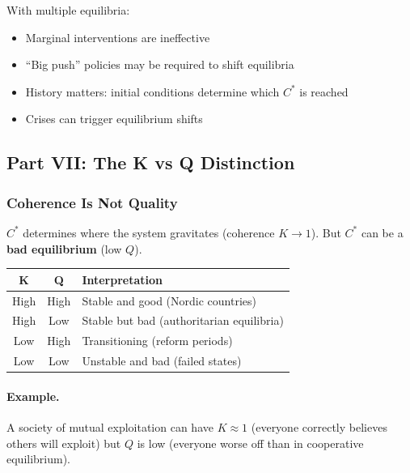 With multiple equilibria:
\begin{itemize}[nosep]
    \item Marginal interventions are ineffective
    \item ``Big push'' policies may be required to shift equilibria
    \item History matters: initial conditions determine which $C^*$ is reached
    \item Crises can trigger equilibrium shifts
\end{itemize}



\subsection{Part VII: The K vs Q Distinction}
\label{sec:D-kvq}

\subsubsection{Coherence Is Not Quality}

$C^*$ determines where the system gravitates (coherence $K \to 1$).
But $C^*$ can be a \textbf{bad equilibrium} (low $Q$).

\begin{center}
\renewcommand{\arraystretch}{1.3}
\begin{tabular}{|c|c|l|}
\hline
\textbf{K} & \textbf{Q} & \textbf{Interpretation} \\
\hline
High & High & Stable and good (Nordic countries) \\
High & Low & Stable but bad (authoritarian equilibria) \\
Low & High & Transitioning (reform periods) \\
Low & Low & Unstable and bad (failed states) \\
\hline
\end{tabular}
\end{center}

\paragraph{Example.}
A society of mutual exploitation can have $K \approx 1$ (everyone correctly
believes others will exploit) but $Q$ is low (everyone worse off than in
cooperative equilibrium).

